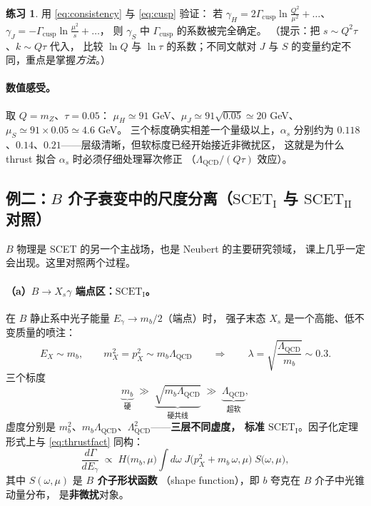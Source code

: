 \documentclass[UTF8,a4paper,11pt]{ctexart}
\theoremstyle{definition}
\newtheorem{exercise}{练习}[section]
\theoremstyle{remark}
\theoremstyle{plain}
\newcommand{\as}{\alpha_s}
\newcommand{\LQCD}{\Lambda_{\mathrm{QCD}}}
\newcommand{\Gcusp}{\Gamma_{\mathrm{cusp}}}
\newcommand{\SCETI}{\text{SCET}_{\mathrm{I}}}
\newcommand{\SCETII}{\text{SCET}_{\mathrm{II}}}
\newcommand{\en}[1]{\textsf{#1}}   %
\begin{document}
\begin{exercise}
用 \eqref{eq:consistency} 与 \eqref{eq:cusp} 验证：
若 $\gamma_H=2\Gcusp\ln\frac{Q^2}{\mu^2}+\dots$、
$\gamma_J=-\Gcusp\ln\frac{\mu^2}{s}+\dots$，
则 $\gamma_S$ 中 $\Gcusp$ 的系数被完全确定。
（提示：把 $s\sim Q^2\tau$、$k\sim Q\tau$ 代入，
比较 $\ln Q$ 与 $\ln\tau$ 的系数；不同文献对
$J$ 与 $S$ 的变量约定不同，重点是掌握\emph{方法}。）
\end{exercise}

\paragraph{数值感受。}取 $Q=m_Z$、$\tau=0.05$：
$\mu_H\simeq91$ GeV、$\mu_J\simeq91\sqrt{0.05}\simeq20$ GeV、
$\mu_S\simeq91\times0.05\simeq4.6$ GeV。
三个标度确实相差一个量级以上，$\as$ 分别约为
$0.118$、$0.14$、$0.21$——层级清晰，但软标度已经开始接近非微扰区，
这就是为什么 thrust 拟合 $\as$ 时必须仔细处理幂次修正
（$\LQCD/(Q\tau)$ 效应）。

\subsection{例二：$B$ 介子衰变中的尺度分离（$\SCETI$ 与 $\SCETII$ 对照）}
\label{subsec:Bdecay}

$B$ 物理是 SCET 的另一个主战场，也是 Neubert 的主要研究领域，
课上几乎一定会出现。这里对照两个过程。

\paragraph{（a）$B\to X_s\gamma$ 端点区：$\SCETI$。}
在 $B$ 静止系中光子能量 $E_\gamma\to m_b/2$（端点）时，
强子末态 $X_s$ 是一个高能、低不变质量的喷注：
\begin{equation}
  E_X\sim m_b,
  \qquad
  m_X^2=p_X^2\sim m_b\LQCD
  \qquad\Longrightarrow\qquad
  \lambda=\sqrt{\frac{\LQCD}{m_b}}\sim0.3 .
\end{equation}
三个标度
\begin{equation}
  \underbrace{m_b}_{\text{硬}}
  \;\gg\;
  \underbrace{\sqrt{m_b\LQCD}}_{\text{硬共线}}
  \;\gg\;
  \underbrace{\LQCD}_{\text{超软}} ,
\end{equation}
虚度分别是 $m_b^2$、$m_b\LQCD$、$\LQCD^2$——\textbf{三层不同虚度，
标准 $\SCETI$}。因子化定理形式上与 \eqref{eq:thrustfact} 同构：
\begin{equation}
  \frac{d\Gamma}{dE_\gamma}
  \;\propto\;
  H\big(m_b,\mu\big)\!\int\! d\omega\;
  J\big(p_X^2+m_b\,\omega,\mu\big)\;
  S\big(\omega,\mu\big) ,
  \label{eq:bsgamma}
\end{equation}
其中 $S(\omega,\mu)$ 是 \textbf{$B$ 介子形状函数}
（\en{shape function}），即 $b$ 夸克在 $B$ 介子中光锥动量分布，
是\textbf{非微扰}对象。
\end{document}
